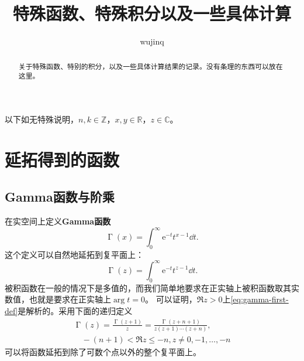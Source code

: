 \documentclass[UTF8]{ctexart}
\title{特殊函数、特殊积分以及一些具体计算}
\author{wujinq}
\newcommand*{\integers}{\mathbb{Z}}
\newcommand*{\reals}{\mathbb{R}}
\newcommand*{\complexes}{\mathbb{C}}
\DeclareMathOperator{\gammafunc}{\Gamma}
\newcommand*{\ee}{\mathrm{e}}
\begin{document}
\maketitle

\begin{abstract}
    关于特殊函数、特别的积分，以及一些具体计算结果的记录。没有条理的东西可以放在这里。
\end{abstract}

以下如无特殊说明，$n, k \in \integers$，$x, y \in \reals$，$z \in \complexes$。

\section{延拓得到的函数}

\subsection{Gamma函数与阶乘}

在实空间上定义\textbf{Gamma函数}
\begin{equation}
    \gammafunc(x) = \int_0^\infty \ee^{-t} t^{x-1} \dd t.
\end{equation}
这个定义可以自然地延拓到复平面上：
\begin{equation}
    \gammafunc(z) = \int_0^\infty \ee^{-t} t^{z-1} \dd t.
    \label{eq:gamma-first-def}
\end{equation}
被积函数在一般的情况下是多值的，而我们简单地要求在正实轴上被积函数取其实数值，也就是要求在正实轴上$\arg t = 0$。
可以证明，$\Re z > 0$上\eqref{eq:gamma-first-def}是解析的。采用下面的递归定义
\[
\begin{split}
    \gammafunc(z) = \frac{\gammafunc(z+1)}{z}=\frac{\gammafunc(z+n+1)}{z(z+1)\cdots(z+n)}, \\
    \quad -(n+1) < \Re z \leq -n, z \neq 0, -1, \ldots, -n
\end{split}
\]
可以将函数延拓到除了可数个点以外的整个复平面上。
\end{document}
